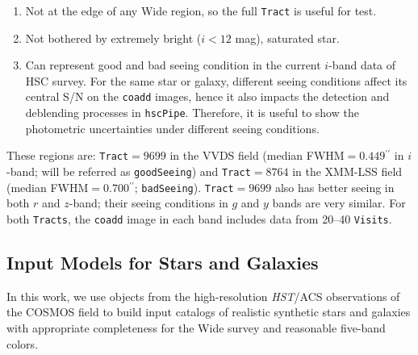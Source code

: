 \documentclass[useamsfonts]{pasj01}
\def\asec{$^{\prime\prime}$}
\def\hscpipe{\texttt{hscPipe}}
\def\tract{\texttt{Tract}}
\def\tracts{\texttt{Tracts}}
\def\visits{\texttt{Visits}}
\def\hst{{\textit{HST}}}
\begin{document}
    \begin{enumerate}

        \item Not at the edge of any Wide region, so the full \tract{} is
            useful for test.

        \item Not bothered by extremely bright ($i<12$ mag), saturated star.

        \item Can represent good and bad seeing condition in the current $i$-band
            data of HSC survey.
            For the same star or galaxy, different seeing conditions affect its
            central S/N on the \texttt{coadd} images, hence it also impacts the
            detection and deblending processes in \hscpipe{}.
            Therefore, it is useful to show the photometric uncertainties under
            different seeing conditions.

    \end{enumerate}

    \noindent These regions are:
    \tract{}$=9699$ in the VVDS field (median FWHM$=0.449$\asec{} in $i$-band;
    will be referred as \texttt{goodSeeing}) and
    \tract{}$=8764$ in the XMM-LSS field (median FWHM$=0.700$\asec{};
    \texttt{badSeeing}).
    \tract{}$=9699$ also has better seeing in both $r$ and $z$-band;
    their seeing conditions in $g$ and $y$ bands are very similar.
    For both \tracts{}, the \texttt{coadd} image in each band includes data from
    20--40 \visits{}.


\subsection{Input Models for Stars and Galaxies}
    \label{ssec:inputs}

    In this work, we use objects from the high-resolution \hst{}/ACS observations of
    the COSMOS field to build input catalogs of realistic synthetic stars and galaxies
    with appropriate completeness for the Wide survey and reasonable five-band colors.
\end{document}
